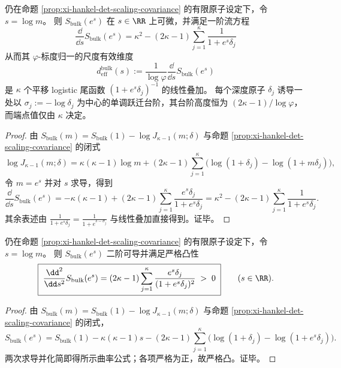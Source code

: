 \begin{corollary}\label{cor:xi-bulk-entropy-rg-staircase}
仍在命题 \ref{prop:xi-hankel-det-scaling-covariance} 的有限原子设定下，令 \(s=\log m\)。
则 \(S_{\mathrm{bulk}}(e^s)\) 在 \(s\in\RR\) 上可微，并满足一阶流方程
\[
\boxed{\;
\frac{\dd}{\dd s}S_{\mathrm{bulk}}(e^s)
=\kappa^{2}-(2\kappa-1)\sum_{j=1}^{\kappa}\frac{1}{1+e^{s}\delta_{j}}\;}
\]
从而其 \(\varphi\)-标度归一的尺度有效维度
\[
d_{\mathrm{eff}}^{\mathrm{bulk}}(s):=\frac{1}{\log\varphi}\frac{\dd}{\dd s}S_{\mathrm{bulk}}(e^s)
\]
是 \(\kappa\) 个平移 logistic 尾函数 \((1+e^{s}\delta_j)^{-1}\) 的线性叠加。
每个深度原子 \(\delta_j\) 诱导一处以 \(\sigma_j:=-\log\delta_j\) 为中心的单调跃迁台阶，其台阶高度恒为 \((2\kappa-1)/\log\varphi\)，而端点值仅由 \(\kappa\) 决定。
\end{corollary}
\begin{proof}
由 \(S_{\mathrm{bulk}}(m)=S_{\mathrm{bulk}}(1)-\log J_{\kappa-1}(m;\delta)\) 与命题 \ref{prop:xi-hankel-det-scaling-covariance} 的闭式
\[
\log J_{\kappa-1}(m;\delta)
=\kappa(\kappa-1)\log m
+(2\kappa-1)\sum_{j=1}^{\kappa}\bigl(\log(1+\delta_j)-\log(1+m\delta_j)\bigr),
\]
令 \(m=e^s\) 并对 \(s\) 求导，得到
\[
\frac{\dd}{\dd s}S_{\mathrm{bulk}}(e^s)
=-\kappa(\kappa-1)+(2\kappa-1)\sum_{j=1}^{\kappa}\frac{e^s\delta_j}{1+e^s\delta_j}
=\kappa^2-(2\kappa-1)\sum_{j=1}^{\kappa}\frac{1}{1+e^s\delta_j}.
\]
其余表述由 \(\frac{1}{1+e^s\delta_j}=\frac{1}{1+e^{s-\sigma_j}}\) 与线性叠加直接得到。证毕。
\end{proof}

\begin{corollary}\label{cor:xi-bulk-entropy-strict-convexity}
仍在命题 \ref{prop:xi-hankel-det-scaling-covariance} 的有限原子设定下，令 \(s=\log m\)。
则 \(S_{\mathrm{bulk}}(e^s)\) 二阶可导并满足严格凸性
\[
\boxed{\;
\frac{\dd^2}{\dd s^2}S_{\mathrm{bulk}}(e^s)
=(2\kappa-1)\sum_{j=1}^{\kappa}\frac{e^s\delta_j}{(1+e^s\delta_j)^2}\;>\;0\;}
\qquad(s\in\RR).
\]
\end{corollary}
\begin{proof}
由 \(S_{\mathrm{bulk}}(m)=S_{\mathrm{bulk}}(1)-\log J_{\kappa-1}(m;\delta)\) 与命题 \ref{prop:xi-hankel-det-scaling-covariance} 的闭式，
\[
S_{\mathrm{bulk}}(e^s)
=S_{\mathrm{bulk}}(1)-\kappa(\kappa-1)s-(2\kappa-1)\sum_{j=1}^{\kappa}\bigl(\log(1+\delta_j)-\log(1+e^s\delta_j)\bigr).
\]
两次求导并化简即得所示曲率公式；各项严格为正，故严格凸。证毕。
\end{proof}

